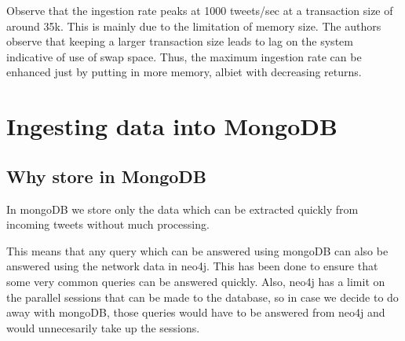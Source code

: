\documentclass[letterpaper,10pt,english]{sphinxmanual}
\begin{document}
Observe that the ingestion rate peaks at 1000 tweets/sec at a transaction size of around 35k. This is mainly due to the limitation of memory size. The authors observe that keeping a larger transaction size leads to lag on the system indicative of use of swap space. Thus, the maximum ingestion rate can be enhanced just by putting in more memory, albiet with decreasing returns.


\chapter{Ingesting data into MongoDB}
\label{\detokenize{mongoDB_data_ingestion:ingesting-data-into-mongodb}}\label{\detokenize{mongoDB_data_ingestion::doc}}

\section{Why store in MongoDB}
\label{\detokenize{mongoDB_data_ingestion:why-store-in-mongodb}}
In mongoDB we store only the data which can be extracted quickly from incoming tweets without much processing.

This means that any query which can be answered using mongoDB can also be answered using the network data in neo4j. This has been done to ensure that some very common queries can be answered quickly. Also, neo4j has a limit on the parallel sessions that can be made to the database, so in case we decide to do away with mongoDB, those queries would have to be answered from neo4j and would unnecesarily take up the sessions.
\end{document}
